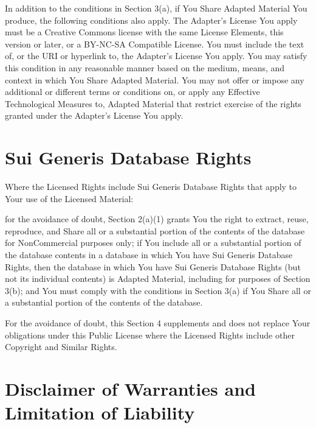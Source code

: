     In addition to the conditions in Section 3(a), if You Share Adapted Material You produce, the following conditions also apply.
        The Adapter’s License You apply must be a Creative Commons license with the same License Elements, this version or later, or a BY-NC-SA Compatible License.
        You must include the text of, or the URI or hyperlink to, the Adapter's License You apply. You may satisfy this condition in any reasonable manner based on the medium, means, and context in which You Share Adapted Material.
        You may not offer or impose any additional or different terms or conditions on, or apply any Effective Technological Measures to, Adapted Material that restrict exercise of the rights granted under the Adapter's License You apply.

\section*{Sui Generis Database Rights}

Where the Licensed Rights include Sui Generis Database Rights that apply to Your use of the Licensed Material:

    for the avoidance of doubt, Section 2(a)(1) grants You the right to extract, reuse, reproduce, and Share all or a substantial portion of the contents of the database for NonCommercial purposes only;
    if You include all or a substantial portion of the database contents in a database in which You have Sui Generis Database Rights, then the database in which You have Sui Generis Database Rights (but not its individual contents) is Adapted Material, including for purposes of Section 3(b); and
    You must comply with the conditions in Section 3(a) if You Share all or a substantial portion of the contents of the database.

For the avoidance of doubt, this Section 4 supplements and does not replace Your obligations under this Public License where the Licensed Rights include other Copyright and Similar Rights.

\section*{Disclaimer of Warranties and Limitation of Liability}

